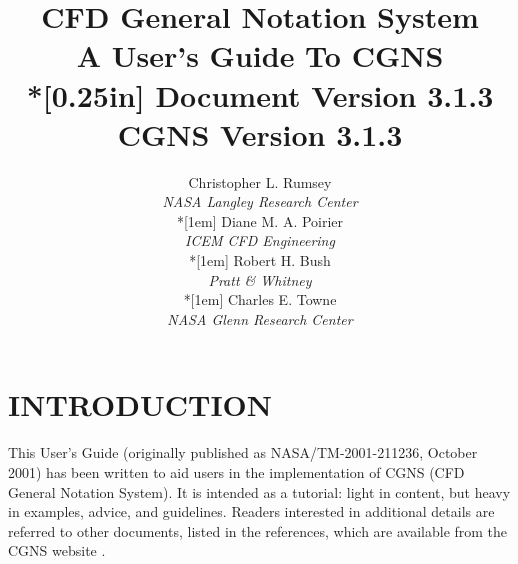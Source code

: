 \documentclass[12pt]{article}
\begin{document}
\posttitle{\par\end{flushleft}\vskip 0.5in}
\preauthor{\begin{flushleft}}
\postauthor{\par\end{flushleft}}
\title{{\bfseries CFD General Notation System\\
A User's Guide To CGNS}\\*[0.25in]
{\Large Document Version 3.1.3\\
CGNS Version 3.1.3}}
\author{Christopher L. Rumsey\\
\textit{NASA Langley Research Center}\\*[1em]
Diane M. A. Poirier\\
\textit{ICEM CFD Engineering}\\*[1em]
Robert H. Bush\\
\textit{Pratt \& Whitney}\\*[1em]
Charles E. Towne\\
\textit{NASA Glenn Research Center}}
\date{}
\maketitle
\thispagestyle{empty}

%
\newpage
\thispagestyle{empty}
\tableofcontents

\newpage
\renewcommand{\thepage}{\arabic{page}}
\section{INTRODUCTION}

This User's Guide (originally published as NASA/TM-2001-211236, October
2001) has been written to aid users in the implementation of CGNS (CFD
General Notation System).
It is intended as a tutorial: light in content, but
heavy in examples, advice, and guidelines.  Readers interested in
additional details are referred to other documents, listed in the references,
which are available from the CGNS website .
\end{document}
